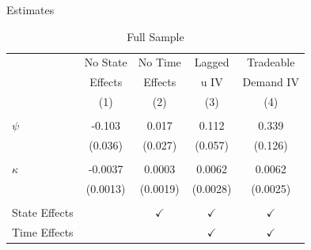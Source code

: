 \documentclass[11pt,aspectratio=169,xcolor={dvipsnames},hyperref={pdftex,pdfpagemode=UseNone,hidelinks,pdfdisplaydoctitle=true},usepdftitle=false]{beamer}
\begin{document}
\begin{frame}{Estimates}
	\begin{table}[t]
		\centering 
		\small
		\caption{Full Sample}
		\begin{tabular}{lcccc} 
			\hline \hline 
			& No State & No Time & Lagged & Tradeable \\
			& Effects & Effects & u IV & Demand IV \\ \hline
			& (1) & (2) & (3) & (4) \\ \hline \\ 
			
			
			$\psi$      &      -0.103   &       0.017   &       0.112   &       0.339  \\
			&     (0.036)   &     (0.027)   &     (0.057)   &     (0.126)   \\
			\\ 
			
			$\kappa$    &     -0.0037   &      0.0003   &      0.0062   &       0.0062   \\
			&    (0.0013)   &    (0.0019)   &    (0.0028)   &     (0.0025)   \\
			\\ \hline
			State Effects &  & $\checkmark$ & $\checkmark$ & $\checkmark$ \\
			Time Effects & & & $\checkmark$ & $\checkmark$ \\
			\hline
		\end{tabular}
	\end{table}
\end{frame}
\end{document}
